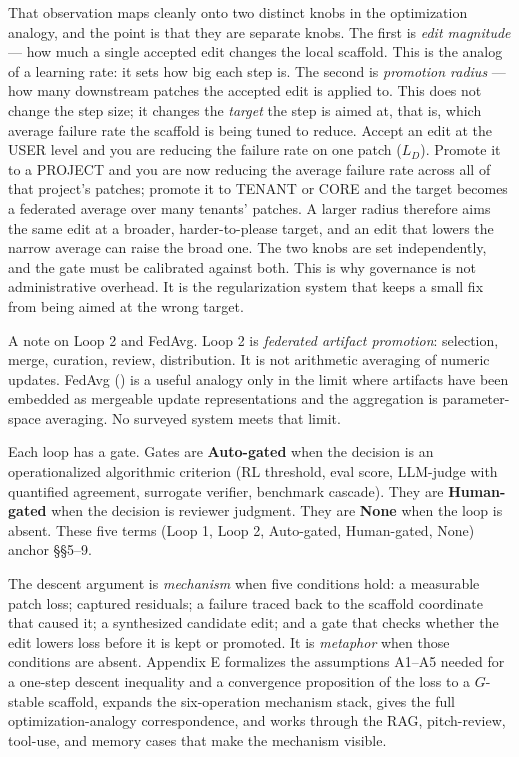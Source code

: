 \documentclass[
]{article}
\begin{document}
That observation maps cleanly onto two distinct knobs in the
optimization analogy, and the point is that they are separate knobs. The
first is \emph{edit magnitude} --- how much a single accepted edit
changes the local scaffold. This is the analog of a learning rate: it
sets how big each step is. The second is \emph{promotion radius} --- how
many downstream patches the accepted edit is applied to. This does not
change the step size; it changes the \emph{target} the step is aimed at,
that is, which average failure rate the scaffold is being tuned to
reduce. Accept an edit at the USER level and you are reducing the
failure rate on one patch (\(L_D\)). Promote it to a PROJECT and you are
now reducing the average failure rate across all of that project's
patches; promote it to TENANT or CORE and the target becomes a federated
average over many tenants' patches. A larger radius therefore aims the
same edit at a broader, harder-to-please target, and an edit that lowers
the narrow average can raise the broad one. The two knobs are set
independently, and the gate must be calibrated against both. This is why
governance is not administrative overhead. It is the regularization
system that keeps a small fix from being aimed at the wrong target.

A note on Loop 2 and FedAvg. Loop 2 is \emph{federated artifact
promotion}: selection, merge, curation, review, distribution. It is not
arithmetic averaging of numeric updates. FedAvg
() is a useful
analogy only in the limit where artifacts have been embedded as
mergeable update representations and the aggregation is parameter-space
averaging. No surveyed system meets that limit.

Each loop has a gate. Gates are \textbf{Auto-gated} when the decision is
an operationalized algorithmic criterion (RL threshold, eval score,
LLM-judge with quantified agreement, surrogate verifier, benchmark
cascade). They are \textbf{Human-gated} when the decision is reviewer
judgment. They are \textbf{None} when the loop is absent. These five
terms (Loop 1, Loop 2, Auto-gated, Human-gated, None) anchor §§5--9.

The descent argument is \emph{mechanism} when five conditions hold: a
measurable patch loss; captured residuals; a failure traced back to the
scaffold coordinate that caused it; a synthesized candidate edit; and a
gate that checks whether the edit lowers loss before it is kept or
promoted. It is \emph{metaphor} when those conditions are absent.
Appendix E formalizes the assumptions A1--A5 needed for a one-step
descent inequality and a convergence proposition of the loss to a
\(G\)-stable scaffold, expands the six-operation mechanism stack, gives
the full optimization-analogy correspondence, and works through the RAG,
pitch-review, tool-use, and memory cases that make the mechanism
visible.
\end{document}
